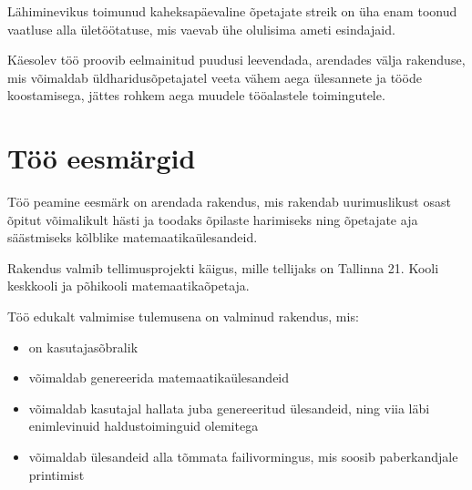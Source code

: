 Lähiminevikus toimunud kaheksapäevaline õpetajate streik \cite{hm-opetajate-streik} on üha enam toonud vaatluse alla ületöötatuse, mis vaevab ühe olulisima ameti esindajaid.

Käesolev töö proovib eelmainitud puudusi leevendada, arendades välja rakenduse, mis võimaldab üldharidusõpetajatel veeta vähem aega ülesannete ja tööde koostamisega, jättes rohkem aega muudele tööalastele toimingutele.

\section{Töö eesmärgid}

Töö peamine eesmärk on arendada rakendus, mis rakendab uurimuslikust osast õpitut võimalikult hästi ja toodaks õpilaste harimiseks ning õpetajate aja säästmiseks kõlblike matemaatikaülesandeid.

Rakendus valmib tellimusprojekti käigus, mille tellijaks on Tallinna 21. Kooli keskkooli ja põhikooli matemaatikaõpetaja.

Töö edukalt valmimise tulemusena on valminud rakendus, mis:

\begin{itemize}
  \item on kasutajasõbralik
  \item võimaldab genereerida matemaatikaülesandeid
  \item võimaldab kasutajal hallata juba genereeritud ülesandeid, ning viia läbi enimlevinuid haldustoiminguid olemitega
  \item võimaldab ülesandeid alla tõmmata failivormingus, mis soosib paberkandjale printimist
\end{itemize}

